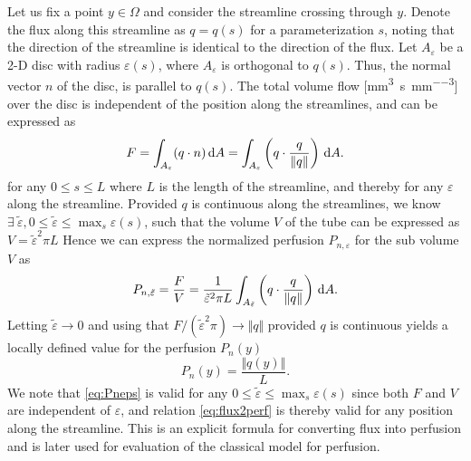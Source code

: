 \documentclass[paper=a4, fontsize=11pt,parskip=half,headings=small]{scrartcl}
\newcommand{\siQmm}{\milli\meter\cubed\per\second\per\milli\meter\cubed}
\begin{document}
	Let us fix a point $y \in \Omega$ and consider the streamline crossing through $y$. Denote the flux along this streamline as $q = q(s)$ for a parameterization $s$, noting that the direction of the streamline is identical to the direction of the flux.
	Let $A_\varepsilon$ be a 2-D disc with radius $\varepsilon(s)$, where  $A_\varepsilon$ is orthogonal to $q(s)$. Thus, the normal vector $n$ of the disc, is parallel to $q(s)$.
	The total volume flow [\si{\siQmm}] over the disc is independent of the position along the streamlines, and can be expressed as
	\begin{equation}
		F = \int_{A_\varepsilon} (q \cdot n) \,\mathrm{d} A = \int_{A_\varepsilon} \left(q\cdot \frac{q}{\Vert q \Vert}\right) \,\mathrm{d} A.
	\end{equation}
	for any $0 \leq s \leq L$ where $L$ is the length of the streamline, and thereby for any $\varepsilon$ along the streamline.
	Provided $q$ is continuous along the streamlines, we know $\exists ~ \tilde{\varepsilon}, 0 \leq \tilde{\varepsilon} \leq \max_s \varepsilon(s)$, such that the volume $V$ of the tube can be expressed as $V = \tilde{\varepsilon}^2\pi L$
	Hence we can express the normalized perfusion $P_{n,\varepsilon}$ for the sub volume $V$ as
	\begin{equation}
		P_{n,\tilde{\varepsilon}} = \frac{F}{V} = \frac{1}{\tilde{\varepsilon}^2 \pi L} \int_{A_{\tilde{\varepsilon}}} \left( q\cdot \frac{q}{\Vert q \Vert} \right) \,\mathrm{d} A. 
		\label{eq:Pneps}
	\end{equation}
	Letting $\tilde{\varepsilon} \to 0$ and using that $F/(\tilde{\varepsilon}^2\pi) \rightarrow \Vert q \Vert$ provided $q$ is continuous yields a locally defined value for the perfusion $P_n(y)$
	\begin{equation}
		P_n(y) = \frac{\Vert q(y) \Vert}{L}.
		\label{eq:flux2perf}
	\end{equation}
	We note that \eqref{eq:Pneps} is valid for any $0 \leq \tilde{\varepsilon} \leq \max_s \varepsilon(s)$ since both $F$ and $V$ are independent of $\varepsilon$, and relation \eqref{eq:flux2perf} is thereby valid for any position along the streamline.
	This is an explicit formula for converting flux into perfusion and is later used for evaluation of the classical model for perfusion. 
	
	
	
\end{document}

